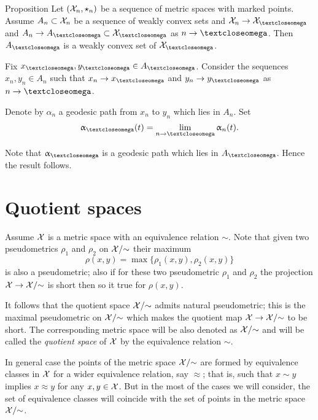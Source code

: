 \begin{thm}{Proposition}\label{prop:weak-convex-stable}
Let $(\mathcal{X}_n,\star_n)$ be a sequence of metric spaces with marked points.
Assume $A_n\subset \spc{X}_n$ be a sequence of weakly convex sets and 
$\spc{X}_n\to \spc{X}_\o$ and $A_n\to A_\o\subset \spc{X}_\o$ as $n\to\o$.
Then $A_\o$ is a weakly convex set of $\spc{X}_\o$.
\end{thm}

Fix $x_\o,y_\o\in A_\o$.
Consider the sequences $x_n,y_n\in A_n$ such that $x_n\to x_\o$ and $y_n\to y_\o$ as $n\to\o$.

Denote by $\alpha_n$ a geodesic path from $x_n$ to $y_n$ which lies in $A_n$.
Set
\[\alpha_\o(t)=\lim_{n\to \o}\alpha_n(t).\]

Note that $\alpha_\o$ is a geodesic path which lies in $A_\o$.
Hence the result follows.
\qeds






\section{Quotient spaces}\label{sec:quotient}

 Assume $\mathcal{X}$ is a metric space
with an equivalence relation $\sim$.
Note that given two pseudometrics $\rho_1$ and $\rho_2$ on $\mathcal{X}/{\sim}$
their maximum 
\[\rho(x,y)=\max\{\rho_1(x,y),\rho_2(x,y)\}\]
is also a pseudometric;
also if for these two pseudometric $\rho_1$ and $\rho_2$ the projection $\spc{X}\to\spc{X}/{\sim}$ is short then so it true for  $\rho(x,y)$.

It follows that 
the quotient space $\mathcal{X}/{\sim}$ admits natural pseudometric;
this is the maximal pseudometric on  $\mathcal{X}/{\sim}$ 
which makes the quotient map 
$\spc{X}\to\spc{X}/{\sim}$ to be short.
The corresponding metric space will be also denoted as $\mathcal{X}/{\sim}$
and will be called the \emph{quotient space} of $\mathcal{X}$ by the equivalence relation $\sim$.

In general case the points of the metric space $\mathcal{X}/{\sim}$
are formed by equivalence classes in $\mathcal{X}$
for a wider equivalence relation, say $\approx$; 
that is, such that $x\sim y$ implies $x\approx y$ for any $x,y\in \spc{X}$.
But in the most of the cases we will consider, 
the set of equivalence classes will coincide with the set of points in the metric space $\mathcal{X}/{\sim}$.



